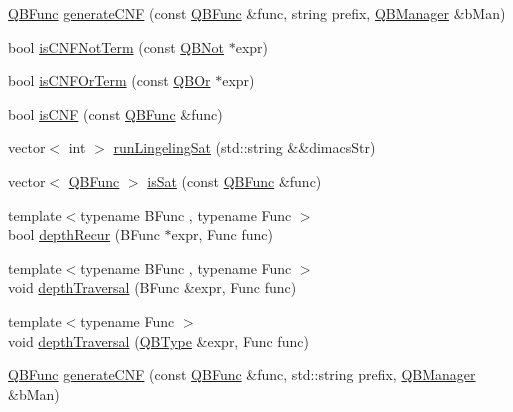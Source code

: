 \begin{DoxyCompactItemize}
\item 
\hyperlink{classQuickMath_1_1QBFunc}{Q\+B\+Func} \hyperlink{namespaceQuickMath_1_1QBAlgo_a38967d834625639ad4040038c274f6c4}{generate\+C\+N\+F} (const \hyperlink{classQuickMath_1_1QBFunc}{Q\+B\+Func} \&func, string prefix, \hyperlink{classQuickMath_1_1QBManager}{Q\+B\+Manager} \&b\+Man)
\item 
bool \hyperlink{namespaceQuickMath_1_1QBAlgo_a58928a3d288af7c50e94a63f54b4fd3a}{is\+C\+N\+F\+Not\+Term} (const \hyperlink{classQuickMath_1_1QBNot}{Q\+B\+Not} $\ast$expr)
\item 
bool \hyperlink{namespaceQuickMath_1_1QBAlgo_ae084c53f5dedaa733811c3563601379b}{is\+C\+N\+F\+Or\+Term} (const \hyperlink{classQuickMath_1_1QBOr}{Q\+B\+Or} $\ast$expr)
\item 
bool \hyperlink{namespaceQuickMath_1_1QBAlgo_af121334ad0919ef45bf1fb0b87f1d31b}{is\+C\+N\+F} (const \hyperlink{classQuickMath_1_1QBFunc}{Q\+B\+Func} \&func)
\item 
vector$<$ int $>$ \hyperlink{namespaceQuickMath_1_1QBAlgo_aa04e30fe5d4d870de2adb8e01f7e918e}{run\+Lingeling\+Sat} (std\+::string \&\&dimacs\+Str)
\item 
vector$<$ \hyperlink{classQuickMath_1_1QBFunc}{Q\+B\+Func} $>$ \hyperlink{namespaceQuickMath_1_1QBAlgo_a3cffa5407d5ed739d8d3f1d0763a52a7}{is\+Sat} (const \hyperlink{classQuickMath_1_1QBFunc}{Q\+B\+Func} \&func)
\item 
{\footnotesize template$<$typename B\+Func , typename Func $>$ }\\bool \hyperlink{namespaceQuickMath_1_1QBAlgo_ac6ae2b1697b8dd4baa5c903589d1c4e9}{depth\+Recur} (B\+Func $\ast$expr, Func func)
\item 
{\footnotesize template$<$typename B\+Func , typename Func $>$ }\\void \hyperlink{namespaceQuickMath_1_1QBAlgo_a6ae30dac4638703751de7a5d042d9cb9}{depth\+Traversal} (B\+Func \&expr, Func func)
\item 
{\footnotesize template$<$typename Func $>$ }\\void \hyperlink{namespaceQuickMath_1_1QBAlgo_a60bdbfc65190e2ac43e3abcf25ffa400}{depth\+Traversal} (\hyperlink{classQuickMath_1_1QBType}{Q\+B\+Type} \&expr, Func func)
\item 
\hyperlink{classQuickMath_1_1QBFunc}{Q\+B\+Func} \hyperlink{namespaceQuickMath_1_1QBAlgo_a35cc2f24230d4675bebd97ba11aaf47e}{generate\+C\+N\+F} (const \hyperlink{classQuickMath_1_1QBFunc}{Q\+B\+Func} \&func, std\+::string prefix, \hyperlink{classQuickMath_1_1QBManager}{Q\+B\+Manager} \&b\+Man)
\end{DoxyCompactItemize}


